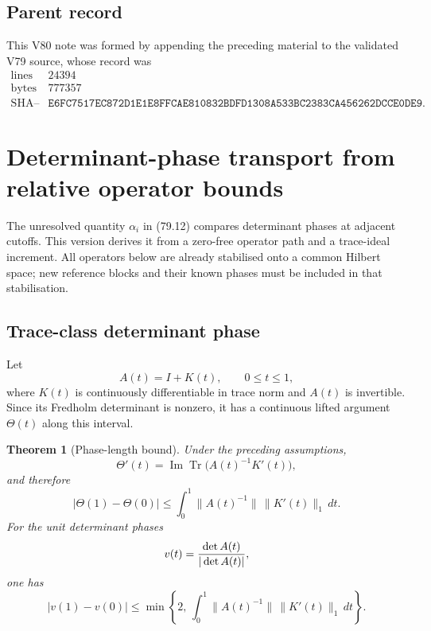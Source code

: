 \documentclass[11pt]{article}
\newtheorem{theorem}{Theorem}[section]
\begin{document}
\subsection{Parent record}

This V80 note was formed by appending the preceding material to the
validated V79 source, whose record was
\[
\begin{array}{c|c}
\text{lines}&24394\\
\text{bytes}&777357\\
\text{SHA--256}&
\texttt{E6FC7517EC872D1E1E8FFCAE810832BDFD1308A533BC2383CA456262DCCE0DE9}.
\end{array}                                                     \tag{80.2}
\]


\section{Determinant-phase transport from relative operator bounds}
\label{sec:v11v81}

The unresolved quantity \(\alpha_i\) in (79.12) compares determinant
phases at adjacent cutoffs.  This version derives it from a zero-free
operator path and a trace-ideal increment.  All operators below are
already stabilised onto a common Hilbert space; new reference blocks
and their known phases must be included in that stabilisation.

\subsection{Trace-class determinant phase}

Let
\[
                         A(t)=I+K(t),\qquad 0\le t\le1,       \tag{81.1}
\]
where \(K(t)\) is continuously differentiable in trace norm and
\(A(t)\) is invertible.  Since its Fredholm determinant is nonzero, it
has a continuous lifted argument \(\Theta(t)\) along this interval.

\begin{theorem}[Phase-length bound]
\label{thm:v11v81-phase-length}
Under the preceding assumptions,
\[
 \Theta'(t)
 =\operatorname{Im}\operatorname{Tr}
       \big(A(t)^{-1}K'(t)\big),                              \tag{81.2}
\]
and therefore
\[
 |\Theta(1)-\Theta(0)|
 \le\int_0^1\|A(t)^{-1}\|\,\|K'(t)\|_1\,dt.                  \tag{81.3}
\]
For the unit determinant phases
\[
                  v(t)={\det A(t)\over|\det A(t)|},
\]
one has
\[
 |v(1)-v(0)|
 \le\min\left\{2,\,
       \int_0^1\|A(t)^{-1}\|\,\|K'(t)\|_1\,dt\right\}.        \tag{81.4}
\]
\end{theorem}
\end{document}
